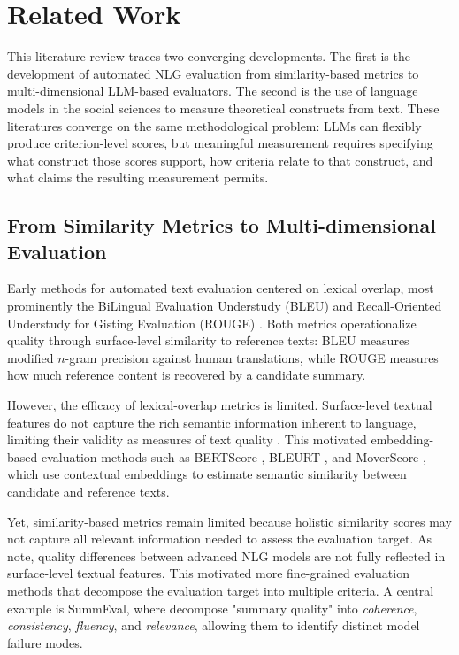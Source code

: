 
\section{Related Work}


This literature review traces two converging developments. The first is the development of automated NLG evaluation from similarity-based metrics to multi-dimensional LLM-based evaluators. The second is the use of language models in the social sciences to measure theoretical constructs from text. These literatures converge on the same methodological problem: LLMs can flexibly produce criterion-level scores, but meaningful measurement requires specifying what construct those scores support, how criteria relate to that construct, and what claims the resulting measurement permits.


\subsection{From Similarity Metrics to Multi-dimensional Evaluation}


Early methods for automated text evaluation centered on lexical overlap, most prominently the BiLingual Evaluation Understudy (BLEU) \citep{papineni_bleu_2001} and Recall-Oriented Understudy for Gisting Evaluation (ROUGE) \citep{lin_rouge_2004}. Both metrics operationalize quality through surface-level similarity to reference texts: BLEU measures modified $n$-gram precision against human translations, while ROUGE measures how much reference content is recovered by a candidate summary.

However, the efficacy of lexical-overlap metrics is limited. Surface-level textual features do not capture the rich semantic information inherent to language, limiting their validity as measures of text quality \citep{reiter2018structured}. This motivated embedding-based evaluation methods such as BERTScore \citep{zhang_bertscore_2020}, BLEURT \citep{sellam_bleurt_2020}, and MoverScore \citep{zhao_moverscore_2019}, which use contextual embeddings to estimate semantic similarity between candidate and reference texts.

Yet, similarity-based metrics remain limited because holistic similarity scores may not capture all relevant information needed to assess the evaluation target. As \citet{gehrmannRepairingCrackedFoundation2022} note, quality differences between advanced NLG models are not fully reflected in surface-level textual features. This motivated more fine-grained evaluation methods that decompose the evaluation target into multiple criteria. A central example is SummEval, where \citet{fabbri_summeval_2021} decompose "summary quality" into \textit{coherence}, \textit{consistency}, \textit{fluency}, and \textit{relevance}, allowing them to identify distinct model failure modes.

